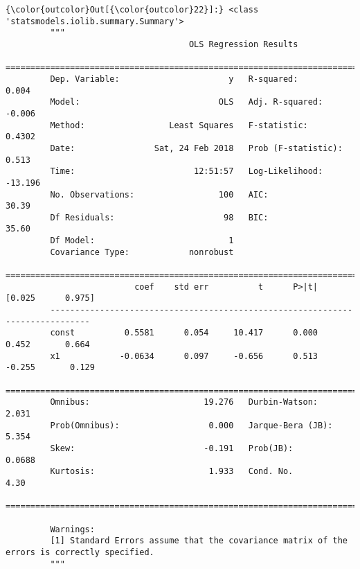 \documentclass[11pt]{article}
\begin{document}
\begin{Verbatim}[commandchars=\\\{\}]
{\color{outcolor}Out[{\color{outcolor}22}]:} <class 'statsmodels.iolib.summary.Summary'>
         """
                                     OLS Regression Results                            
         ==============================================================================
         Dep. Variable:                      y   R-squared:                       0.004
         Model:                            OLS   Adj. R-squared:                 -0.006
         Method:                 Least Squares   F-statistic:                    0.4302
         Date:                Sat, 24 Feb 2018   Prob (F-statistic):              0.513
         Time:                        12:51:57   Log-Likelihood:                -13.196
         No. Observations:                 100   AIC:                             30.39
         Df Residuals:                      98   BIC:                             35.60
         Df Model:                           1                                         
         Covariance Type:            nonrobust                                         
         ==============================================================================
                          coef    std err          t      P>|t|      [0.025      0.975]
         ------------------------------------------------------------------------------
         const          0.5581      0.054     10.417      0.000       0.452       0.664
         x1            -0.0634      0.097     -0.656      0.513      -0.255       0.129
         ==============================================================================
         Omnibus:                       19.276   Durbin-Watson:                   2.031
         Prob(Omnibus):                  0.000   Jarque-Bera (JB):                5.354
         Skew:                          -0.191   Prob(JB):                       0.0688
         Kurtosis:                       1.933   Cond. No.                         4.30
         ==============================================================================
         
         Warnings:
         [1] Standard Errors assume that the covariance matrix of the errors is correctly specified.
         """
\end{Verbatim}
            
\end{document}
